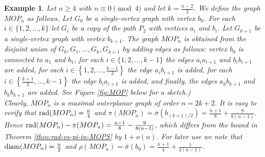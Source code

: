 \documentclass[a4paper,11pt]{article}
\newtheorem{example}{Example}[section]
\begin{document}
\begin{example}\label{exa:MOP}
Let $n \geq 4$ with $n\equiv 0 \pmod{4}$ and let $k = \frac{n-2}{2}$. We define the graph $MOP_n$ as follows. 
Let $G_0$ be a single-vertex graph with vertex $b_0$. 
For each $i \in \{1, 2, \ldots, k\}$ let $G_i$ be a copy of the path $P_2$ with vertices $a_i$ and $b_i$. 
Let $G_{k+1}$ be a single-vertex graph with vertex $b_{k+1}$. 
The graph $MOP_n$ is obtained from the disjoint union of $G_0, G_1, \ldots, G_k, G_{k+1}$ by adding edges as follows: 
vertex $b_0$ is connected to $a_1$ and $b_1$, 
for each $i \in \{1, 2, \ldots, k-1\}$ the edges $a_i a_{i+1}$ and $b_i b_{i+1}$ are added, 
for each $i \in \left\{1, 2, \ldots, \frac{k-1}{2} \right\}$ the edge $a_i b_{i+1}$ is added, 
for each $i \in \left\{\frac{k+1}{2}, \ldots, k-1 \right\}$ the edge $b_i a_{i+1}$ is added, 
and finally, the edges $a_k b_{k+1}$ and $b_k b_{k+1}$ are added. 
See Figure \ref{fig:MOP} below for a sketch.) \\
 
Clearly, $MOP_n$ is a maximal outerplanar graph of order $n=2k+2$. It is easy to verify that
${\rm rad}(MOP_n) = \frac{n}{4}$ and 
$\pi(MOP_n) = \overline{\sigma}(b_{(k+1)/2}) = \frac{n+1}{8} + \frac{9}{8(n-1)}$.
Hence ${\rm rad}(MOP_n) - \pi(MOP_n) = \frac{n-1}{8} - \frac{9}{8(n-1)}$, which differs from
the bound in Theorem \ref{theo:rad-vs-pi-in-MOPS} by $1 +o(n)$.
For later use  we note that 
${\rm diam}(MOP_n) = \frac{n}{2}$ and 
$\rho(MOP_n) = \overline{\sigma}(b_0) = \frac{n+1}{4} + \frac{1}{4(n-1)}$.
\end{example}
\end{document}
